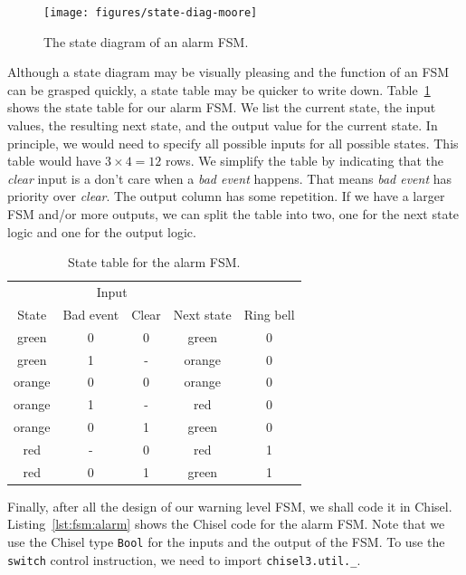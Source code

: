 \documentclass[%
    10pt,
    headinclude, footexclude,
    openright, %
    notitlepage,
    cleardoubleempty,
    headsepline,
    pointlessnumbers,
    bibtotoc, idxtotoc,
    ]{scrbook}
\newcommand{\code}[1]{{\small{\texttt{#1}}}}
\begin{document}
\begin{figure}
  \centering
  \texttt{[image: figures/state-diag-moore]}
  \caption{The state diagram of an alarm FSM.}
  \label{fig:diag-moore}
\end{figure}

Although a state diagram may be visually pleasing and the function of an FSM
can be grasped quickly, a state table may be quicker to write down.
Table~\ref{tab:state:table} shows the state table for our alarm FSM.
We list the current state, the input values, the resulting next state, and
the output value for the current state. In principle, we would need to
specify all possible inputs for all possible states. This table would have
$3 \times 4 = 12$ rows. We simplify the table by indicating that the \emph{clear}
input is a don't care when a \emph{bad event} happens. That means
\emph{bad event} has priority over \emph{clear}. The output column
has some repetition. If we have a larger FSM and/or more outputs, we
can split the table into two, one for the next state logic and one for the
output logic.

\begin{table}
\centering
\caption{State table for the alarm FSM.}
\begin{tabular}{ccccc}
\toprule
& \multicolumn{2}{c}{Input} \\
\cmidrule{2-3}
State &  Bad event & Clear & Next state & Ring bell \\
\midrule
green & 0 & 0 & green & 0 \\
green & 1 & - & orange & 0 \\
orange & 0 & 0 & orange & 0 \\
orange & 1 & - & red & 0 \\
orange & 0 & 1 & green & 0 \\
red & - & 0 & red & 1 \\
red & 0 & 1 & green & 1 \\
\bottomrule
\end{tabular}
\label{tab:state:table}
\end{table}

Finally, after all the design of our warning level FSM, we shall code it in Chisel.
Listing~\ref{lst:fsm:alarm} shows the Chisel code for the alarm FSM.
Note that we use the Chisel type \code{Bool} for the inputs and the
output of the FSM.
To use the \code{switch} control instruction, we need to
import \code{chisel3.util.\_}.

\end{document}
